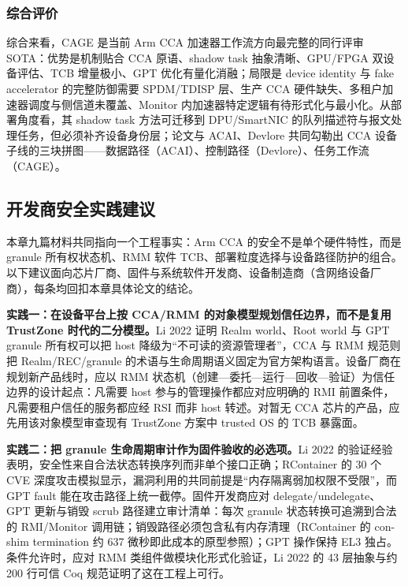 \documentclass[11pt]{ctexart}
\begin{document}
\subsubsection{综合评价}
综合来看，CAGE 是当前 Arm CCA 加速器工作流方向最完整的同行评审 SOTA：优势是机制贴合 CCA 原语、shadow task 抽象清晰、GPU/FPGA 双设备评估、TCB 增量极小、GPT 优化有量化消融；局限是 device identity 与 fake accelerator 的完整防御需要 SPDM/TDISP 层、生产 CCA 硬件缺失、多租户加速器调度与侧信道未覆盖、Monitor 内加速器特定逻辑有待形式化与最小化。从部署角度看，其 shadow task 方法可迁移到 DPU/SmartNIC 的队列描述符与报文处理任务，但必须补齐设备身份层；论文与 ACAI、Devlore 共同勾勒出 CCA 设备子线的三块拼图——数据路径（ACAI）、控制路径（Devlore）、任务工作流（CAGE）。\par

\subsection{开发商安全实践建议}
本章九篇材料共同指向一个工程事实：Arm CCA 的安全不是单个硬件特性，而是 granule 所有权状态机、RMM 软件 TCB、部署粒度选择与设备路径防护的组合。以下建议面向芯片厂商、固件与系统软件开发商、设备制造商（含网络设备厂商），每条均回扣本章具体论文的结论。\par
\noindent\textbf{实践一：在设备平台上按 CCA/RMM 的对象模型规划信任边界，而不是复用 TrustZone 时代的二分模型。}Li 2022 证明 Realm world、Root world 与 GPT granule 所有权可以把 host 降级为“不可读的资源管理者”\cite{li2022cca}，CCA 与 RMM 规范则把 Realm/REC/granule 的术语与生命周期语义固定为官方架构语言\cite{arm_cca_spec,arm_rmm_spec}。设备厂商在规划新产品线时，应以 RMM 状态机（创建—委托—运行—回收—验证）为信任边界的设计起点：凡需要 host 参与的管理操作都应对应明确的 RMI 前置条件，凡需要租户信任的服务都应经 RSI 而非 host 转述。对暂无 CCA 芯片的产品，应先用该对象模型审查现有 TrustZone 方案中 trusted OS 的 TCB 暴露面。\par
\noindent\textbf{实践二：把 granule 生命周期审计作为固件验收的必选项。}Li 2022 的验证经验表明，安全性来自合法状态转换序列而非单个接口正确\cite{li2022cca}；RContainer 的 30 个 CVE 深度攻击模拟显示，漏洞利用的共同前提是“内存隔离弱加权限不受限”，而 GPT fault 能在攻击路径上统一截停\cite{zhou2025rcontainer}。固件开发商应对 delegate/undelegate、GPT 更新与销毁 scrub 路径建立审计清单：每次 granule 状态转换可追溯到合法的 RMI/Monitor 调用链；销毁路径必须包含私有内存清理（RContainer 的 con-shim termination 约 637 微秒即此成本的原型参照）；GPT 操作保持 EL3 独占。条件允许时，应对 RMM 类组件做模块化形式化验证，Li 2022 的 43 层抽象与约 200 行可信 Coq 规范证明了这在工程上可行。\par
\end{document}
